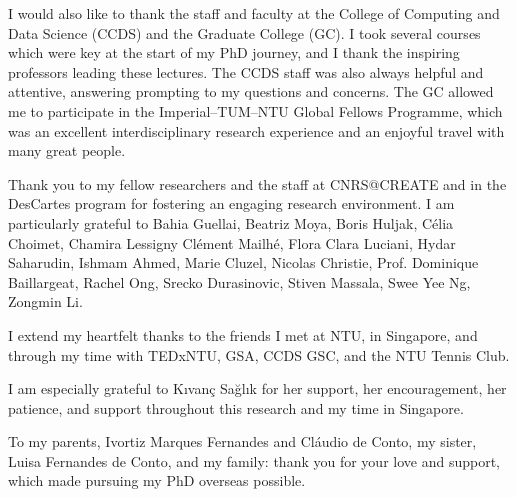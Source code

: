 {I would also like to thank the staff and faculty at the College of Computing and Data Science (CCDS) and the Graduate College (GC). I took several courses which were key at the start of my PhD journey, and I thank the inspiring professors leading these lectures. The CCDS staff was also always helpful and attentive, answering prompting to my questions and concerns. 
%
The GC allowed me to participate in the Imperial--TUM--NTU Global Fellows Programme, which was an excellent interdisciplinary research experience and an enjoyful travel with many great people. 

Thank you to my fellow researchers and the staff at CNRS@CREATE and in the DesCartes program for fostering an engaging research environment.
I am particularly grateful to
Bahia Guellai,
Beatriz Moya,
Boris Huljak,
Célia Choimet,
Chamira Lessigny
Clément Mailhé,
Flora Clara Luciani, 
Hydar Saharudin,
Ishmam Ahmed,
Marie Cluzel,
Nicolas Christie,
Prof. Dominique Baillargeat, 
Rachel Ong,
Srecko Durasinovic,
Stiven Massala,
Swee Yee Ng,
Zongmin Li.
\fi

I extend my heartfelt thanks to the friends I met at NTU, in Singapore, and through my time with TEDxNTU, GSA, CCDS GSC, and the NTU Tennis Club. 



I am especially grateful to Kıvanç Sağlık for her support, her encouragement, her patience, and support throughout this research and my time in Singapore.

To my parents, Ivortiz Marques Fernandes and Cláudio de Conto, my sister, Luisa Fernandes de Conto, and my family: thank you for your love and support, which made pursuing my PhD overseas possible.

}
